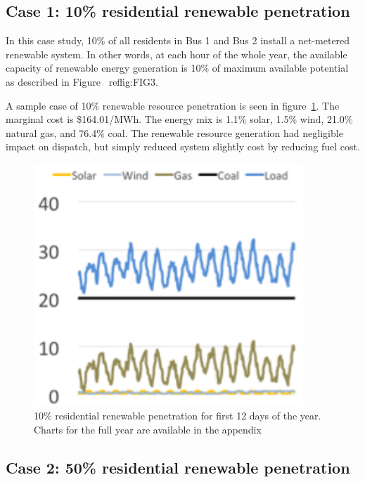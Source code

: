 \documentclass[a4paper]{article}
\begin{document}
\subsection{Case 1: 10\% residential renewable penetration}

In this case study, 10\% of all residents in Bus 1 and Bus 2 install a net-metered renewable system. In other words, at each hour of the whole year, the available capacity of renewable energy generation is 10\% of maximum available potential as described in Figure ~ref{fig:FIG3}. 

A sample case of 10\% renewable resource penetration is seen in figure~\ref{fig:FIG4}. The marginal cost is \$164.01/MWh. The energy mix is 1.1\% solar, 1.5\% wind, 21.0\% natural gas, and 76.4\% coal. The renewable resource generation had negligible impact on dispatch, but simply reduced system slightly cost by reducing fuel cost.

\begin{figure}[h!]
\centering
\includegraphics[width=0.9\textwidth , height=0.25\textheight]{FIG4.png}
\caption{\label{fig:FIG4}10\% residential renewable penetration for first 12 days of the year. Charts for the full year are available in the appendix}
\end{figure}

\subsection{Case 2: 50\% residential renewable penetration}
\end{document}
